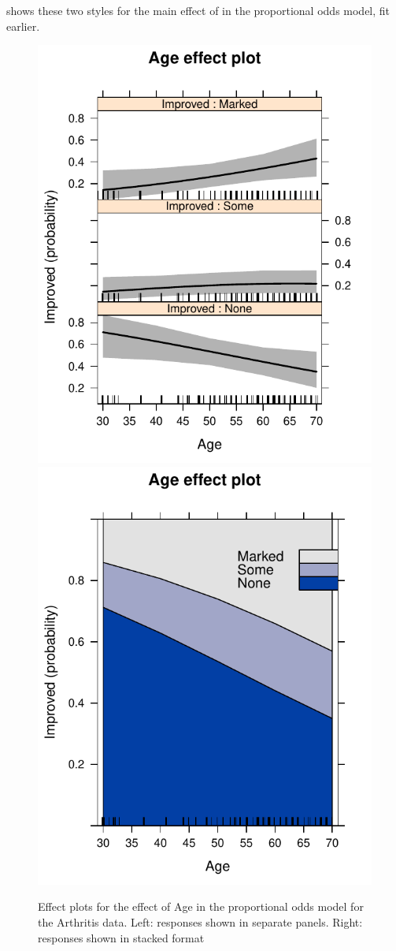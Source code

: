 \documentclass[11pt]{book}
\renewenvironment{knitrout}{\small\renewcommand{\baselinestretch}{.85}}{} %
\begin{document}
 shows these two styles for the main effect of 
in the proportional odds model,  fit earlier.
\begin{knitrout}
\color{fgcolor}\begin{kframe}
\begin{alltt}
\hlstd{(}\hlstd{(}
\hlstd{(}\hlstd{(} \hlstd{=}\hlstd{,}
     \hlstd{=}\hlstd{(}\hlstd{=}\hlstd{,} \hlstd{=}\hlstd{))}
\end{alltt}
\end{kframe}\begin{figure}[!htbp]


\centerline{\includegraphics[width=.49\textwidth]{ch07/fig/arth-po-eff11} 
\includegraphics[width=.49\textwidth]{ch07/fig/arth-po-eff12} }

\caption[Effect plots for the effect of Age in the proportional odds model for the Arthritis data]{Effect plots for the effect of Age in the proportional odds model for the Arthritis data.  Left: responses shown in separate panels. Right: responses shown in stacked format\label{fig:arth-po-eff1}}
\end{figure}


\end{knitrout}
\end{document}
